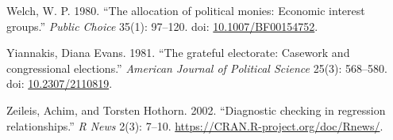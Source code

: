\documentclass[12pt,]{article}
\newlength{\cslhangindent}
\newenvironment{CSLReferences}[2]%
    {\setlength{\parindent}{0pt}%
    \everypar{\setlength{\hangindent}{\cslhangindent}}\ignorespaces}%
    {\par}
\begin{document}
\begin{CSLReferences}{1}{0}
\leavevmode{}%
Welch, W. P. 1980. {``The allocation of political monies: Economic
interest groups.''} \emph{Public Choice} 35(1): 97--120. doi:
\href{https://doi.org/10.1007/BF00154752}{10.1007/BF00154752}.

\leavevmode{}%
Yiannakis, Diana Evans. 1981. {``The grateful electorate: Casework and
congressional elections.''} \emph{American Journal of Political Science}
25(3): 568--580. doi:
\href{https://doi.org/10.2307/2110819}{10.2307/2110819}.

\leavevmode{}%
Zeileis, Achim, and Torsten Hothorn. 2002. {``Diagnostic checking in
regression relationships.''} \emph{R News} 2(3): 7--10.
\url{https://CRAN.R-project.org/doc/Rnews/}.

\end{CSLReferences}





\newpage

\singlespacing 
\end{document}

